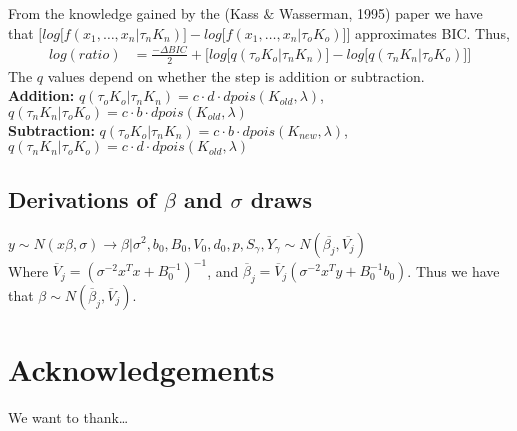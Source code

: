 \documentclass[submit]{smj}
\begin{document}
From the knowledge gained by the (Kass $\&$ Wasserman, 1995) paper we have that $\Big[ log \big[ f(x_1,\dots,x_n | \tau_{n} K_{n}) \big] -  log \big[ f(x_1,\dots,x_n | \tau_{o} K_{o})\big] \Big] $ approximates BIC. Thus,
\begin{align*}
log(ratio) &= \frac{- \Delta BIC}{2} + 
\Big[ log \big[ q(\tau_{o} K_{o} | \tau_{n} K_{n}) \big] - log \big[ q(\tau_{n} K_{n}| \tau_{o} K_{o})  \big] \Big]
\end{align*}
The $q$ values depend on whether the step is addition or subtraction. \\
\textbf{Addition:} 
$q(\tau_{o} K_{o} | \tau_{n} K_{n}) = c \cdot d \cdot dpois(K_{old} , \lambda)$, $q(\tau_{n} K_{n} | \tau_{o} K_{o}) = c \cdot b \cdot dpois(K_{old} , \lambda)$
\\
\textbf{Subtraction:}
$q(\tau_{o} K_{o} | \tau_{n} K_{n}) = c \cdot b \cdot dpois(K_{new} , \lambda)$, $q(\tau_{n} K_{n} | \tau_{o} K_{o}) = c \cdot d \cdot dpois(K_{old} , \lambda)$ \\


\subsection{Derivations of $\beta$ and $\sigma$ draws}


$y \sim  N(x \beta , \sigma ) \longrightarrow \beta | \sigma^2, b_0, B_0, V_0, d_0, p , S_{\gamma}, Y_{\gamma} \sim N( \overline{\beta_j } , \overline{V_j} )$ \\ Where $\overline{V}_j = (\sigma^{-2}x^Tx + B_0^{-1})^{-1}$, and $\overline{\beta}_j = \overline{V}_j(\sigma^{-2}x^Ty + B_0^{-1}b_0)$. Thus we have that $\beta  \sim N(\overline{\beta}_j, \overline{V}_j)$. 



\section*{Acknowledgements}
We want to thank\ldots



\end{document}
